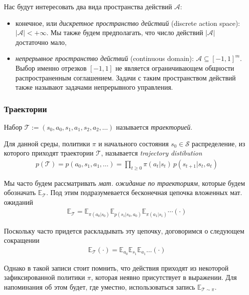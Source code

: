 \documentclass[%
	11pt,
	a4paper,
	utf8,
		]{article}
\begin{document}
Нас будут интересовать два вида пространства действий $ \mathcal{A} $:
\begin{itemize}
	\item конечное, или \emph{дискретное пространство действий} (discrete action space): $ | \mathcal{A} | < + \infty $. Мы также будем предполагать, что число действий $ | \mathcal{A} | $ достаточно мало,
	
	\item \emph{непрерывное пространство действий} (continuous domain): $ \mathcal{A} \subseteq [-1, 1]^m $. Выбор именно отрезков $ [-1, 1] $ не является ограничивающем общности распространенным соглашением. Задачи с таким пространством действий также называют задачами непрерывного управления.
\end{itemize}

\subsubsection{Траектории}

Набор $ \mathcal{T} := (s_0, a_0, s_1, a_1, s_2, a_2, \ldots) $ называется \emph{траекторией}.

Для данной среды, политики $ \pi $ и начального состояния $ s_0 \in \mathcal{S} $ распределение, из которого приходят траектории $ \mathcal{T} $, называется \emph{trajectory distibution}
\begin{align*}
	p(\mathcal{T}) = p(a_0, s_1, a_1, \ldots) = \prod_{t \geqslant 0} \pi (a_t | s_t) \, p(s_{t+1} | s_t, a_t)
\end{align*}

Мы часто будем рассматривать \emph{мат. ожидание по траекториям}, которые будем обозначать $ \mathbb{E}_{\mathcal{T}} $. Под этим подразумевается бесконечная цепочка вложенных мат. ожиданий
\begin{align*}
	\mathbb{E}_{\mathcal{T}} = \mathbb{E}_{\pi (a_0 | s_0)} \mathbb{E}_{p(s_1 | s_0, a_0)} \mathbb{E}_{\pi(a_1 | s_1)} \cdots (\cdot)
\end{align*}

Поскольку часто придется раскладывать эту цепочку, договоримся о следующем сокращении
\begin{align*}
	\mathbb{E}_{\mathcal{T}} (\cdot) = \mathbb{E}_{a_0} \mathbb{E}_{s_1} \mathbb{E}_{a_1} \ldots (\cdot)
\end{align*}

Однако в такой записи стоит помнить, что действия приходят из некоторой зафиксированной политики $ \pi $, которая неявно присутствует в выражении. Для напоминания об этом будет, где уместно, использоваться запись $ \mathbb{E}_{\mathcal{T} \sim \pi} $.
\end{document}
